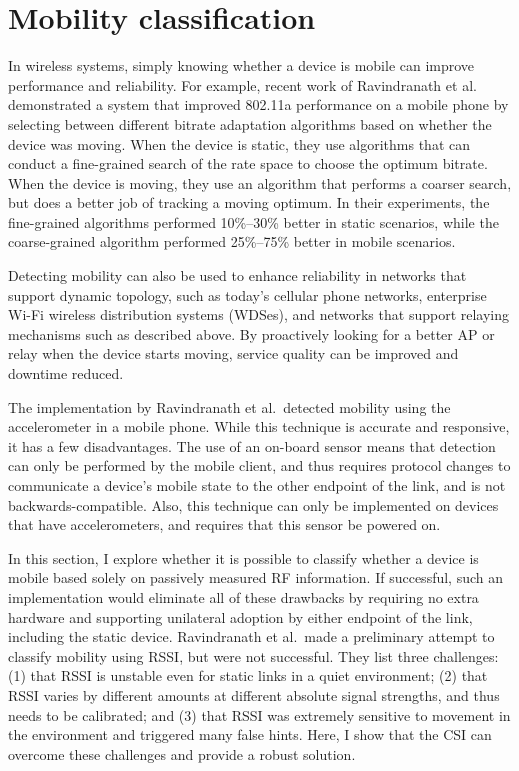\section{Mobility classification}\label{sec:esnr_mobility}
In wireless systems, simply knowing whether a device is mobile can improve performance and reliability. For example, recent work of Ravindranath et al.\ \cite{Ravindranath_SensorHints} demonstrated a system that improved 802.11a performance on a mobile phone by selecting between different bitrate adaptation algorithms based on whether the device was moving. When the device is static, they use algorithms that can conduct a fine-grained search of the rate space to choose the optimum bitrate. When the device is moving, they use an algorithm that performs a coarser search, but does a better job of tracking a moving optimum. In their experiments, the fine-grained algorithms performed 10\%--30\% better in static scenarios, while the coarse-grained algorithm performed 25\%--75\% better in mobile scenarios.

Detecting mobility can also be used to enhance reliability in networks that support dynamic topology, such as today's cellular phone networks, enterprise Wi-Fi wireless distribution systems (WDSes), and networks that support relaying mechanisms such as described above. By proactively looking for a better AP or relay when the device starts moving, service quality can be improved and downtime reduced. 

The implementation by Ravindranath et al.\ detected mobility using the accelerometer in a mobile phone. While this technique is accurate and responsive, it has a few disadvantages. The use of an on-board sensor means that detection can only be performed by the mobile client, and thus requires protocol changes to communicate a device's mobile state to the other endpoint of the link, and is not backwards-compatible. Also, this technique can only be implemented on devices that have accelerometers, and requires that this sensor be powered on.

In this section, I explore whether it is possible to classify whether a device is mobile based solely on passively measured RF information. If successful, such an implementation would eliminate all of these drawbacks by requiring no extra hardware and supporting unilateral adoption by either endpoint of the link, including the static device. Ravindranath et al.\ made a preliminary attempt to classify mobility using RSSI, but were not successful. They list three challenges: (1) that RSSI is unstable even for static links in a quiet environment; (2) that RSSI varies by different amounts at different absolute signal strengths, and thus needs to be calibrated; and (3) that RSSI was extremely sensitive to movement in the environment and triggered many false hints. Here, I show that the CSI can overcome these challenges and provide a robust solution.


